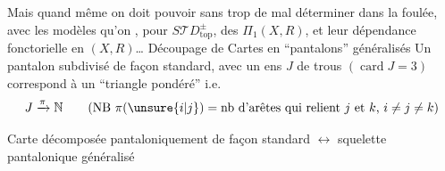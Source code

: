 Mais quand même on doit pouvoir sans trop de mal déterminer dans la foulée, avec les modèles qu'on , pour $S\mathcal TD_{\mathrm{top}}^\pm$, des  $\Pi_1(X,R)$, et leur dépendance fonctorielle en $(X,R)$\ldots
{}
Découpage de Cartes en ``pantalons'' généralisés
Un pantalon  subdivisé de façon standard, avec un ens $J$ de trous $(\operatorname{card}J=3)$ correspond à un ``triangle pondéré'' i.e.
\[
J\xrightarrow{\pi}\mathbb N
\qquad(\mathrm{NB}\ \pi(\unsure{i|j})=\text{nb d'arêtes qui relient $j$ et $k$, $i\ne j\ne k$})
\]

Carte  décomposée pantaloniquement de façon standard $\longleftrightarrow$  squelette pantalonique généralisé


